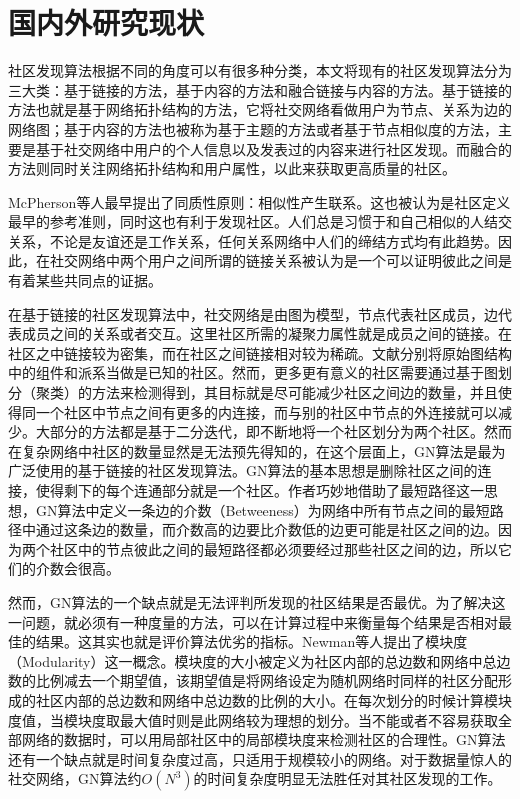 \section{国内外研究现状}%
社区发现算法根据不同的角度可以有很多种分类，本文将现有的社区发现算法分为三大类：基于链接的方法，基于内容的方法和融合链接与内容的方法。基于链接的方法也就是基于网络拓扑结构的方法，它将社交网络看做用户为节点、关系为边的网络图；基于内容的方法也被称为基于主题的方法或者基于节点相似度的方法，主要是基于社交网络中用户的个人信息以及发表过的内容来进行社区发现。而融合的方法则同时关注网络拓扑结构和用户属性，以此来获取更高质量的社区。

McPherson等人最早提出了同质性原则：相似性产生联系\cite{Mcpherson2001Birds}。这也被认为是社区定义最早的参考准则，同时这也有利于发现社区。人们总是习惯于和自己相似的人结交关系，不论是友谊还是工作关系，任何关系网络中人们的缔结方式均有此趋势。因此，在社交网络中两个用户之间所谓的链接关系被认为是一个可以证明彼此之间是有着某些共同点的证据。

在基于链接的社区发现算法中，社交网络是由图为模型，节点代表社区成员，边代表成员之间的关系或者交互。这里社区所需的凝聚力属性就是成员之间的链接。在社区之中链接较为密集，而在社区之间链接相对较为稀疏。文献\cite{Fortunato2009Community}分别将原始图结构中的组件和派系当做是已知的社区。然而，更多更有意义的社区需要通过基于图划分（聚类）的方法来检测得到，其目标就是尽可能减少社区之间边的数量，并且使得同一个社区中节点之间有更多的内连接，而与别的社区中节点的外连接就可以减少。大部分的方法都是基于二分迭代，即不断地将一个社区划分为两个社区。然而在复杂网络中社区的数量显然是无法预先得知的，在这个层面上，GN算法\cite{2002Community}是最为广泛使用的基于链接的社区发现算法。GN算法的基本思想是删除社区之间的连接，使得剩下的每个连通部分就是一个社区。作者巧妙地借助了最短路径这一思想，GN算法中定义一条边的介数（Betweeness）为网络中所有节点之间的最短路径中通过这条边的数量，而介数高的边要比介数低的边更可能是社区之间的边。因为两个社区中的节点彼此之间的最短路径都必须要经过那些社区之间的边，所以它们的介数会很高。

然而，GN算法的一个缺点就是无法评判所发现的社区结果是否最优。为了解决这一问题，就必须有一种度量的方法，可以在计算过程中来衡量每个结果是否相对最佳的结果。这其实也就是评价算法优劣的指标。Newman等人提出了模块度（Modularity）\cite{NewmanFind}这一概念。模块度的大小被定义为社区内部的总边数和网络中总边数的比例减去一个期望值，该期望值是将网络设定为随机网络时同样的社区分配形成的社区内部的总边数和网络中总边数的比例的大小。在每次划分的时候计算模块度值，当模块度取最大值时则是此网络较为理想的划分。当不能或者不容易获取全部网络的数据时，可以用局部社区中的局部模块度来检测社区的合理性。GN算法还有一个缺点就是时间复杂度过高，只适用于规模较小的网络。对于数据量惊人的社交网络，GN算法约$O(N^3)$的时间复杂度明显无法胜任对其社区发现的工作。

